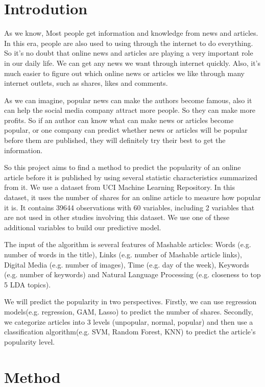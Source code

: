 \documentclass[11pt]{article}
\begin{document}
\section{Introdution}
As we know, Most people get information and knowledge from news and articles. In this era, people are also used to using through the internet to do everything. So it’s no doubt that online news and articles are playing a very important role in our daily life. We can get any news we want through internet quickly. Also, it’s much easier to figure out which online news or articles we like through many internet outlets, such as shares, likes and comments. 

As we can imagine, popular news can make the authors become famous, also it can help the social media company attract more people. So they can make more profits. So if an author can know what can make news or articles become popular, or one company can predict whether news or articles will be popular before them are published, they will definitely try their best to get the information. 

So this project aims to find a method to predict the popularity of an online article before it is published by using several statistic characteristics summarized from it. We use a dataset from UCI Machine Learning Repository. In this dataset, it uses the number of shares for an online article to measure how popular it is. It contains 39644 observations with 60 variables, including 2 variables that are not used in other studies involving this dataset. We use one of these additional variables to build our predictive model. 

The input of the algorithm is several features of Mashable articles: Words (e.g. number of words in the title), Links (e.g. number of Mashable article links), Digital Media (e.g. number of images), Time (e.g. day of the week), Keywords (e.g. number of keywords) and Natural Language Processing (e.g. closeness to top 5 LDA topics).

We will predict the popularity in two perspectives. Firstly, we can use regression models(e.g. regression, GAM, Lasso) to predict the number of shares. Secondly, we categorize articles into 3 levels (unpopular, normal, popular) and then use a classification algorithm(e.g. SVM, Random Forest, KNN) to predict the article's popularity level.  

\section{Method}
\end{document}
